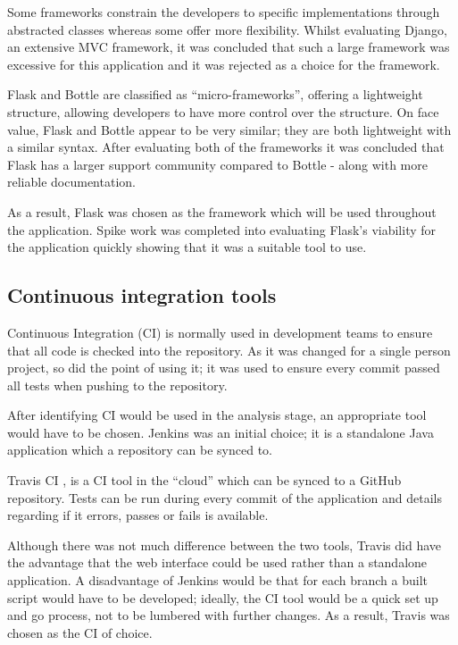 Some frameworks constrain the developers to specific implementations through abstracted classes whereas some offer more flexibility. Whilst evaluating Django, an extensive MVC framework, it was concluded that such a large framework was excessive for this application and it was rejected as a choice for the framework.

Flask and Bottle are classified as ``micro-frameworks'', offering a lightweight structure, allowing developers to have more control over the structure. On face value, Flask and Bottle appear to be very similar; they are both lightweight with a similar syntax. After evaluating both of the frameworks it was concluded that Flask has a larger support community compared to Bottle - along with more reliable documentation.

As a result, Flask was chosen as the framework which will be used throughout the application. Spike work was completed into evaluating Flask's viability for the application quickly showing that it was a suitable tool to use.

\subsection{Continuous integration tools} \label{tools:CI}
Continuous Integration (CI) is normally used in development teams to ensure that all code is checked into the repository. As it was changed for a single person project, so did the point of using it; it was used to ensure every commit passed all tests when pushing to the repository.

After identifying CI would be used in the analysis stage, an appropriate tool would have to be chosen. Jenkins \cite{citeulike:14023837} was an initial choice; it is a standalone Java application which a repository can be synced to.

Travis CI \cite{citeulike:14023840}, is a CI tool in the ``cloud'' which can be synced to a GitHub repository. Tests can be run during every commit of the application and details regarding if it errors, passes or fails is available.

Although there was not much difference between the two tools, Travis did have the advantage that the web interface could be used rather than a standalone application. A disadvantage of Jenkins would be that for each branch a built script would have to be developed; ideally, the CI tool would be a quick set up and go process, not to be lumbered with further changes. As a result, Travis was chosen as the CI of choice.

